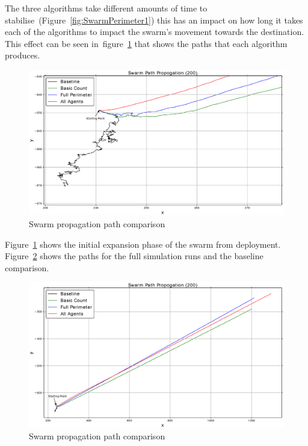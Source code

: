 The three algorithms take different amounts of time to stabilise~(Figure~\ref{fig:SwarmPerimeter1}) this has an impact on how long it takes each of the algorithms to impact the swarm's movement towards the destination. This effect can be seen in~figure~\ref{reduced:SwarmPropagationPathComparison1} that shows the paths that each algorithm produces. 

\begin{figure}[H]
\begin{center}
\includegraphics[width=14cm]{CHAPTER-6/figures/SwarmPropagationComparison1}
\end{center}
\caption{Swarm propagation path comparison\label{reduced:SwarmPropagationPathComparison1}}
\end{figure}

Figure~\ref{reduced:SwarmPropagationPathComparison1} shows the initial expansion phase of the swarm from deployment. Figure~\ref{reduced:SwarmPropagationPathComparison2} shows the paths for the full simulation runs and the baseline comparison.

\begin{figure}[H]
\begin{center}
\includegraphics[width=14cm]{CHAPTER-6/figures/SwarmPropagationComparison2}
\end{center}
\caption{Swarm propagation path comparison\label{reduced:SwarmPropagationPathComparison2}}
\end{figure}


